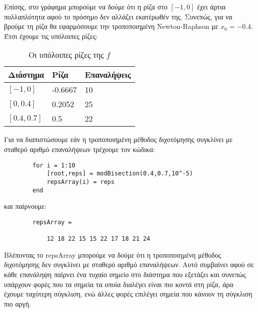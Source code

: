 \documentclass[12pt,a4paper]{article}
\begin{document}
    Επίσης, στο γράφημα μπορούμε να δούμε ότι η ρίζα στο $[-1,0]$ έχει άρτια πολλαπλότητα αφού το πρόσημο δεν αλλάζει εκατέρωθέν της. Συνεπώς, για να βρούμε τη 
    ρίζα θα εφαρμόσουμε την τροποποιημένη Newton-Raphson με $x_0 = -0.4$. Έτσι έχουμε τις υπόλοιπες ρίζες:

    \begin{table}[H]
        \centering
        \begin{tabular}{|l|l|l|}
        \hline
        Διάστημα    & Ρίζα    & Επαναλήψεις \\ \hline
        $[-1,0]$    & -0.6667 & 10          \\ \hline
        $[0,0.4]$   & 0.2052  & 25          \\ \hline
        $[0.4,0.7]$ & 0.5     & 22          \\ \hline
        \end{tabular}
        \caption{Οι υπόλοιπες ρίζες της $f$}
        \label{tab:f-roots}
    \end{table}

    Για να διαπιστώσουμε εάν η τροποποιημένη μέθοδος διχοτόμησης συγκλίνει με σταθερό αριθμό επαναλήψεων τρέχουμε τον κώδικα:
    \begin{lstlisting}
        for i = 1:10
            [root,reps] = modBisection(0.4,0.7,10^-5)
            repsArray(i) = reps
        end
    \end{lstlisting}
    και παίρνουμε:
    \begin{lstlisting}
        repsArray =

            12 18 22 15 15 22 17 18 21 24
    \end{lstlisting}
    Βλέποντας το repsArray μπορούμε να δούμε ότι η τροποποιημένη μέθοδος διχοτόμησης δεν συγκλίνει με σταθερό αριθμό επαναλήψεων. Αυτό 
    συμβαίνει αφού σε κάθε επανάληψη παίρνει ένα τυχαίο σημείο στο διάστημα που εξετάζει και συνεπώς υπάρχουν φορές που τα σημεία τα 
    οποία διαλέγει είναι πιο κοντά στη ρίζα, άρα έχουμε ταχύτερη σύγκλιση, ενώ άλλες φορές επιλέγει σημεία που κάνουν τη σύγκλιση πιο 
    αργή.
\end{document}
